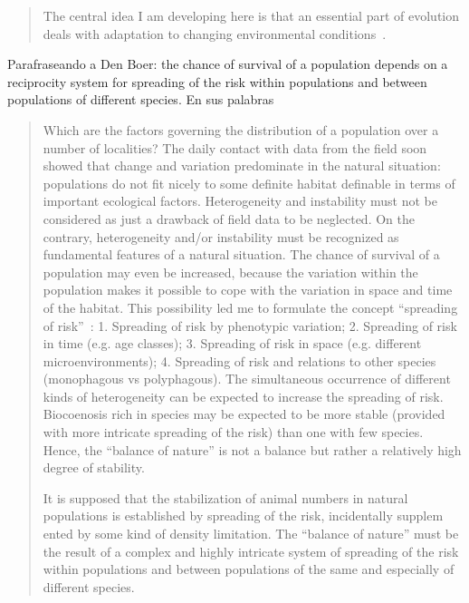 \documentclass[a4paper,10pt]{article}
\begin{document}
\begin{quotation}
    The central idea I am developing here is that an essential part of evolution deals with adaptation to changing environmental conditions~\cite{pigliucci2001-plasticity}.
\end{quotation}

Parafraseando a Den Boer: the chance of survival of a population depends on a reciprocity system for spreading of the risk within populations and between populations of different species.
En sus palabras
\begin{quotation}
    Which are the factors governing the distribution of a population over a number of localities?
    The daily contact with data from the field soon showed that change and variation predominate in the natural situation: populations do not fit
    nicely to some definite habitat definable in terms of important ecological factors.
    Heterogeneity and instability must not be considered as just a drawback of field data to be neglected.
    On the contrary, heterogeneity and/or instability must be recognized as fundamental features of a natural situation.
    The chance of survival of a population may even be increased, because the variation within the population makes it possible to cope with the variation in space and time of the habitat.
    This possibility led me to formulate the concept ``spreading of risk''~\cite{denBoer1968-spreadingRisk}: 1. Spreading of risk by phenotypic variation; 2. Spreading of risk in time (e.g. age classes); 3. Spreading of risk in space (e.g. different microenvironments); 4. Spreading of risk and relations to other species (monophagous vs polyphagous).
    The simultaneous occurrence of different kinds of heterogeneity can be expected to increase the spreading of risk.
    Biocoenosis rich in species may be expected to be more stable (provided with more intricate spreading of the risk) than one with few species.
    Hence, the ``balance of nature'' is not a balance but rather a relatively high degree of stability.

    It is supposed that the stabilization of animal numbers in natural populations is established by spreading of the risk, incidentally supplem ented by some kind of density limitation.
    The ``balance of nature'' must be the result of a complex and highly intricate system of spreading of the risk within populations and between populations of the same and especially of different species.
\end{quotation}
\end{document}
